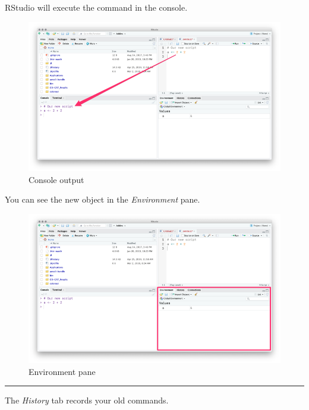 \documentclass[]{book}
\begin{document}
RStudio will execute the command in the console.

\begin{figure}
\centering
\includegraphics{img/rstudio_source_ex2.png}
\caption{Console output}
\end{figure}

You can see the new object in the \emph{Environment} pane.

\begin{figure}
\centering
\includegraphics{img/rstudio_source_ex3.png}
\caption{Environment pane}
\end{figure}

\begin{center}\rule{0.5\linewidth}{\linethickness}\end{center}

The \emph{History} tab records your old commands.
\end{document}
